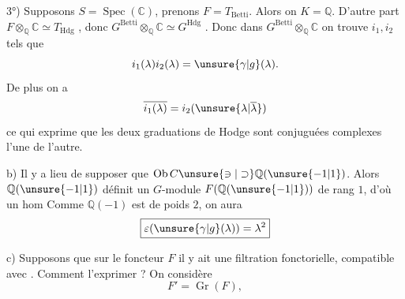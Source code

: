 3°) Supposons $S=\operatorname{Spec}(\mathbb{C})$, prenons
$F=T_{\mathrm{Betti}}$.
Alors on  $K=\mathbb{Q}$. D'autre part
$F\otimes_{\mathbb{Q}}\mathbb{C}\simeq T_{\mathrm{Hdg}}$
,
donc
$G^{\mathrm{Betti}}\otimes_{\mathbb{Q}}\mathbb{C}\simeq G^{\mathrm{Hdg}}$
.
Donc dans $G^{\mathrm{Betti}}\otimes_{\mathbb{Q}}\mathbb{C}$ on trouve
 $i_1,i_2$
tels que
\[
 i_1(\lambda)i_2(\lambda)=\unsure{\gamma|g}(\lambda).
\]
De plus on a
\[
 \overline{i_1(\lambda)}=i_2(\unsure{\lambda|\overline\lambda})
\]
ce qui exprime que les deux graduations
de Hodge sont conjuguées complexes l'une de
l'autre.

b) Il y a lieu de supposer que
$\operatorname{Ob}C\unsure{\ni|\supset}\mathbb{Q}(\unsure{-1|1})$.
Alors $\mathbb{Q}(\unsure{-1|1})$  définit
un $G$-module $F(\mathbb{Q}(\unsure{-1|1}))$ de rang $1$,
d'où un hom
Comme $\mathbb{Q}(-1)$ est de  poids $2$, on aura
\[
 \boxed{\varepsilon(\unsure{\gamma|g}(\lambda))=\lambda^2}
\]

c) Supposons que sur le foncteur $F$ il y ait
une filtration fonctorielle, compatible avec .
Comment l'exprimer ? On considère
\[
 F'=\operatorname{Gr}(F),
\]
